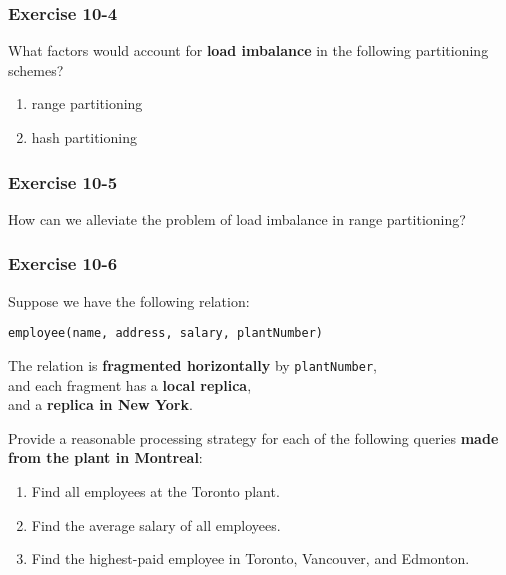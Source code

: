 \begin{frame}
\frametitle{Exercise 10-4}

What factors would account for \textbf{load imbalance} in the following partitioning schemes?

\begin{enumerate}
  \item range partitioning
  \item hash partitioning
\end{enumerate}

\end{frame}


\begin{frame}
\frametitle{Exercise 10-5}

How can we alleviate the problem of load imbalance in range partitioning?

\end{frame}


\begin{frame}
\frametitle{Exercise 10-6}

Suppose we have the following relation: \\
\begin{center}
  \texttt{employee(name, address, salary, plantNumber)}
\end{center}

The relation is \textbf{fragmented horizontally} by \texttt{plantNumber}, \\
and each fragment has a \textbf{local replica}, \\
and a \textbf{replica in New York}.

Provide a reasonable processing strategy for each of the following queries \textbf{made from the plant in Montreal}:

\begin{enumerate}
  \item Find all employees at the Toronto plant.
  \item Find the average salary of all employees.
  \item Find the highest-paid employee in Toronto, Vancouver, and Edmonton.
\end{enumerate}

\end{frame}


